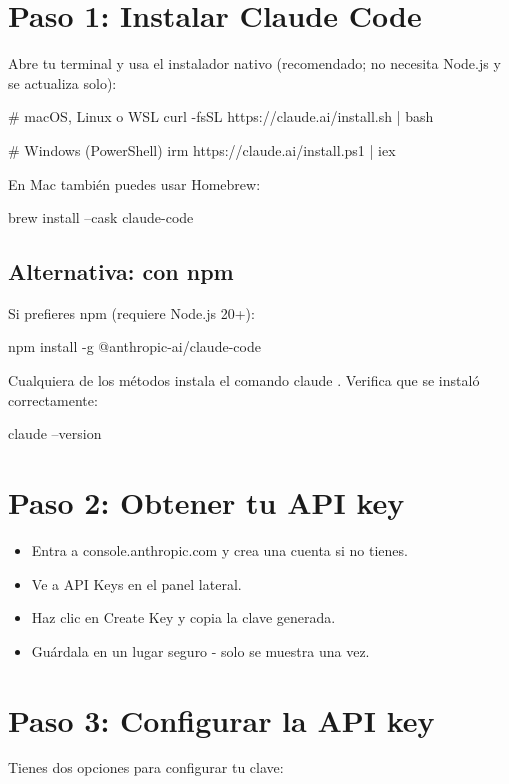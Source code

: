 \documentclass[11pt,a4paper]{book}
\begin{document}
\section{Paso 1: Instalar Claude Code}
Abre tu terminal y usa el instalador nativo (recomendado; no necesita Node.js y se actualiza solo):

\begin{codebox}
# macOS, Linux o WSL
curl -fsSL https://claude.ai/install.sh | bash

# Windows (PowerShell)
irm https://claude.ai/install.ps1 | iex
\end{codebox}
En Mac también puedes usar Homebrew:

\begin{codebox}
brew install --cask claude-code
\end{codebox}
\subsection{Alternativa: con npm}
Si prefieres npm (requiere Node.js 20+):

\begin{codebox}
npm install -g @anthropic-ai/claude-code
\end{codebox}
Cualquiera de los métodos instala el comando claude . Verifica que se instaló correctamente:

\begin{codebox}
claude --version
\end{codebox}
\section{Paso 2: Obtener tu API key}
\begin{itemize}\item Entra a console.anthropic.com y crea una cuenta si no tienes.\end{itemize}
\begin{itemize}\item Ve a API Keys en el panel lateral.\end{itemize}
\begin{itemize}\item Haz clic en Create Key y copia la clave generada.\end{itemize}
\begin{itemize}\item Guárdala en un lugar seguro - solo se muestra una vez.\end{itemize}
\section{Paso 3: Configurar la API key}
Tienes dos opciones para configurar tu clave:
\end{document}
